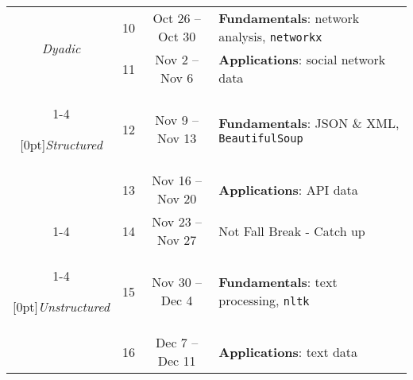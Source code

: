 \documentclass[10pt]{memoir}
\begin{document}
\begin{table}[h]
\begin{tabular}{cccl}
    \multirow{2}{*}[0pt]{\textit{Dyadic}} %
        & 10 & Oct 26 -- Oct 30 & \textbf{Fundamentals}: network analysis, \texttt{networkx} \\
        & 11 & Nov 2 -- Nov 6 & \textbf{Applications}: social network data \\ \cmidrule[.1em](lr){1-4}
        
    \multirow{2}{*}[0pt]{\textit{Structured}} %
        & 12 & Nov 9 -- Nov 13 & \textbf{Fundamentals}: JSON \& XML, \texttt{BeautifulSoup} \\
        & 13 & Nov 16 -- Nov 20 & \textbf{Applications}: API data \\ 
        \cmidrule[.1em](lr){1-4}
    
    & 14 & Nov 23 -- Nov 27 & Not Fall Break - Catch up \\ \cmidrule[.1em](lr){1-4}
    
    \multirow{2}{*}[0pt]{\textit{Unstructured}} %
        & 15 & Nov 30 -- Dec 4 & \textbf{Fundamentals}: text processing, \texttt{nltk} \\ 
        & 16 & Dec 7 -- Dec 11 & \textbf{Applications}: text data \\
        
    \bottomrule[.15em]
\end{tabular}\\
\end{table}

\renewcommand{\bibsection}{\section{\huge \bibname}\prebibhook}
\baselineskip 14.2pt

\end{document}
